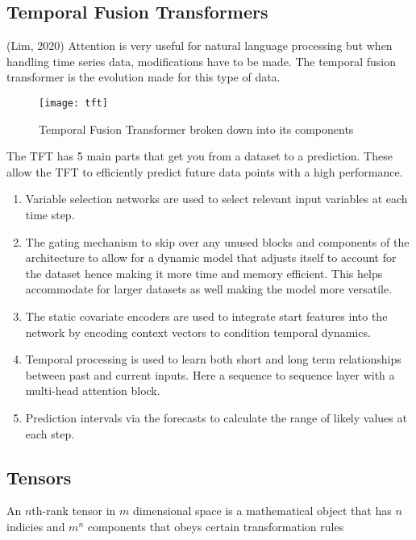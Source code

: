 \documentclass{article}
\begin{document}
\subsection{Temporal Fusion Transformers}
(Lim, 2020)
Attention is very useful for natural language processing but when handling time series data,
modifications have to be made. The temporal fusion transformer is the evolution made for this
type of data.
\begin{figure}[h!]
    \centering
    \texttt{[image: tft]}
    \caption{Temporal Fusion Transformer broken down into its components}
\end{figure}
The TFT has 5 main parts that get you from a dataset to a prediction. These allow the TFT to
efficiently predict future data points with a high performance.
\begin{enumerate}
\item Variable selection networks are used to select relevant input variables at each time step.
\item The gating mechanism to skip over any unused blocks and components of the architecture to allow for a dynamic model that adjusts itself to account for the dataset hence making it more time and memory efficient. This helps accommodate for larger datasets as well making the model more versatile.
\item The static covariate encoders are used to integrate start features into the network by encoding context vectors to condition temporal dynamics.
\item Temporal processing is used to learn both short and long term relationships between past and current inputs. Here a sequence to sequence layer with a multi-head attention block.
\item Prediction intervals via the forecasts to calculate the range of likely values at each step.
\end{enumerate}

\subsection{Tensors}
An $n$th-rank tensor in $m$ dimensional space is a mathematical object that has $n$ indicies and $m^n$ components that obeys certain transformation rules
\end{document}
